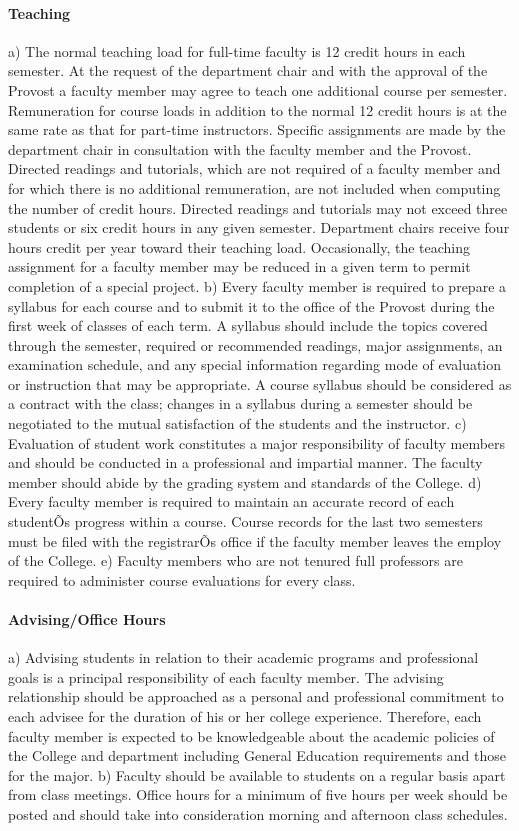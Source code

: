 \documentclass[letterpaper, 11pt]{article}
\begin{document}
			\paragraph{Teaching}
				a) The normal teaching load for full-time faculty is 12 credit hours in each semester.  At the request of the department chair and with the approval of the Provost a faculty member may agree to teach one additional course per semester.  Remuneration for course loads in addition to the normal 12 credit hours is at the same rate as that for part-time instructors.  Specific assignments are made by the department chair in consultation with the faculty member and the Provost.  Directed readings and tutorials, which are not required of a faculty member and for which there is no additional remuneration, are not included when computing the number of credit hours.  Directed readings and tutorials may not exceed three students or six credit hours in any given semester.  Department chairs receive four hours credit per year toward their teaching load.  Occasionally, the teaching assignment for a faculty member may be reduced in a given term to permit completion of a special project.
				b) Every faculty member is required to prepare a syllabus for each course and to submit it to the office of the Provost during the first week of classes of each term.  A syllabus should include the topics covered through the semester, required or recommended readings, major assignments, an examination schedule, and any special information regarding mode of evaluation or instruction that may be appropriate.  A course syllabus should be considered as a contract with the class; changes in a syllabus during a semester should be negotiated to the mutual satisfaction of the students and the instructor.
				c) Evaluation of student work constitutes a major responsibility of faculty members and should be conducted in a professional and impartial manner.  The faculty member should abide by the grading system and standards of the College.
				d) Every faculty member is required to maintain an accurate record of each studentÕs progress within a course.  Course records for the last two semesters must be filed with the registrarÕs office if the faculty member leaves the employ of the College.
				e) Faculty members who are not tenured full professors are required to administer course evaluations for every class.
			\paragraph{Advising/Office Hours}
				a) Advising students in relation to their academic programs and professional goals is a principal responsibility of each faculty member.  The advising relationship should be approached as a personal and professional commitment to each advisee for the duration of his or her college experience.  Therefore, each faculty member is expected to be knowledgeable about the academic policies of the College and department including General Education requirements and those for the major.
				b) Faculty should be available to students on a regular basis apart from class meetings. Office hours for a minimum of five hours per week should be posted and should take into consideration morning and afternoon class schedules.
\end{document}
